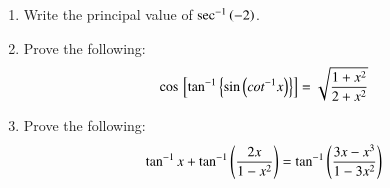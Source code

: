 \begin{enumerate}

\item Write the principal value of $\sec^{-1} \left(-2\right)$.

\hfill{}\item Prove the following:
    \begin{align*}
        \cos {}\left[\tan^{-1} \left\{\sin \left(cot^{-1} x\right)\right\}\right] = \sqrt{\frac{1 + x^2}{2 + x^2}}
    \end{align*}

\hfill{}\item Prove the following:
    \begin{align*}
        \tan^{-1} x + \tan^{-1} \left(\frac{2x}{1 - x^2}\right) = \tan^{-1} \left(\frac{3x - x^3}{1 - 3x^2}\right)
    \end{align*}
\hfill{}
\end{enumerate}
